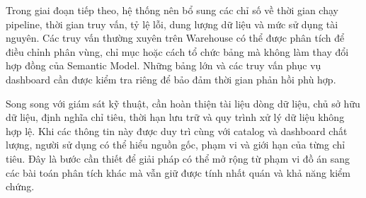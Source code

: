 Trong giai đoạn tiếp theo, hệ thống nên bổ sung các chỉ số về thời gian chạy pipeline, thời gian truy vấn, tỷ lệ lỗi, dung lượng dữ liệu và mức sử dụng tài nguyên. Các truy vấn thường xuyên trên Warehouse có thể được phân tích để điều chỉnh phân vùng, chỉ mục hoặc cách tổ chức bảng mà không làm thay đổi hợp đồng của Semantic Model. Những bảng lớn và các truy vấn phục vụ dashboard cần được kiểm tra riêng để bảo đảm thời gian phản hồi phù hợp.

Song song với giám sát kỹ thuật, cần hoàn thiện tài liệu dòng dữ liệu, chủ sở hữu dữ liệu, định nghĩa chỉ tiêu, thời hạn lưu trữ và quy trình xử lý dữ liệu không hợp lệ. Khi các thông tin này được duy trì cùng với catalog và dashboard chất lượng, người sử dụng có thể hiểu nguồn gốc, phạm vi và giới hạn của từng chỉ tiêu. Đây là bước cần thiết để giải pháp có thể mở rộng từ phạm vi đồ án sang các bài toán phân tích khác mà vẫn giữ được tính nhất quán và khả năng kiểm chứng.

